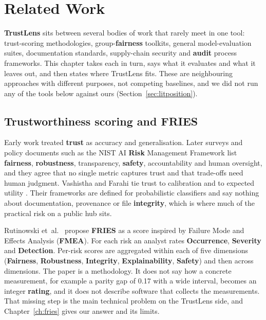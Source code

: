 \chapter{Related Work}\label{ch:lit}

\textbf{TrustLens} sits between several bodies of work that rarely meet in one tool: trust-scoring methodologies, group-\textbf{fairness} toolkits, general model-evaluation suites, documentation standards, supply-chain security and \textbf{audit} process frameworks. This chapter takes each in turn, says what it evaluates and what it leaves out, and then states where TrustLens fits. These are neighbouring approaches with different purposes, not competing baselines, and we did not run any of the tools below against ours (Section~\ref{sec:litposition}).

\section{Trustworthiness scoring and FRIES}
Early work treated \textbf{trust} as accuracy and generalisation. Later surveys \cite{kemmerzell2025,mattioli2024} and policy documents such as the NIST AI \textbf{Risk} Management Framework \cite{nist2023} list \textbf{fairness}, \textbf{robustness}, transparency, \textbf{safety}, accountability and human oversight, and they agree that no single metric captures trust and that trade-offs need human judgment. Vashistha and Farahi tie trust to calibration \cite{vashistha2025} and to expected utility \cite{vashistha2024}. Their frameworks are defined for probabilistic classifiers and say nothing about documentation, provenance or file \textbf{integrity}, which is where much of the practical risk on a public hub sits.

Rutinowski et~al.\ \cite{rutinowski2024} propose \textbf{FRIES} as a score inspired by Failure Mode and Effects Analysis (\textbf{FMEA}). For each risk an analyst rates \textbf{Occurrence}, \textbf{Severity} and \textbf{Detection}. Per-risk scores are aggregated within each of five dimensions (\textbf{Fairness}, \textbf{Robustness}, \textbf{Integrity}, \textbf{Explainability}, \textbf{Safety}) and then across dimensions. The paper is a methodology. It does not say how a concrete measurement, for example a parity gap of 0.17 with a wide interval, becomes an integer \textbf{rating}, and it does not describe software that collects the measurements. That missing step is the main technical problem on the TrustLens side, and Chapter~\ref{ch:fries} gives our answer and its limits.

